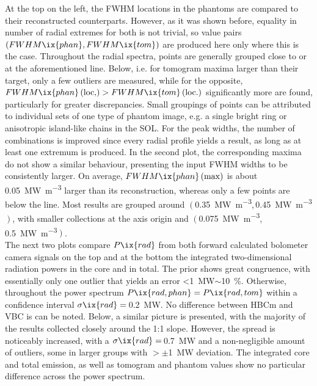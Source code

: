                 At the top on the left, the FWHM locations in the phantoms are compared to their reconstructed counterparts. However, as it was shown before, equality in number of radial extremes for both is not trivial, so value pairs $\left(FWHM\ix{phan}, FWHM\ix{tom}\right)$ are produced here only where this is the case. Throughout the radial spectra, points are generally grouped close to or at the aforementioned line. Below, i.e. for tomogram maxima larger than their target, only a few outliers are measured, while for the opposite, $FWHM\ix{phan}\left(\text{loc,}\right)>FWHM\ix{tom}\left(\text{loc.}\right)$ significantly more are found, particularly for greater discrepancies. Small groupings of points can be attributed to individual sets of one type of phantom image, e.g. a single bright ring or anisotropic island-like chains in the SOL. For the peak widths, the number of combinations is improved since every radial profile yields a result, as long as at least one extremum is produced. In the second plot, the corresponding maxima do not show a similar behaviour, presenting the input FWHM widths to be consistently larger. On average, $FWHM\ix{phan}\left(\text{max}\right)$ is about \SI{0.05}{\mega\watt\per\cubic\meter} larger than its reconstruction, whereas only a few points are below the line. Most results are grouped around $\left(\right.$\SI{0.35}{\mega\watt\per\cubic\meter},\,\SI{0.45}{\mega\watt\per\cubic\meter}$\left.\right)$, with smaller collections at the axis origin and $\left(\right.$\SI{0.075}{\mega\watt\per\cubic\meter},\,\SI{0.5}{\mega\watt\per\cubic\meter}$\left.\right)$.\\%
                The next two plots compare $P\ix{rad}$ from both forward calculated bolometer camera signals on the top and at the bottom the integrated two-dimensional radiation powers in the core and in total. The prior shows great congruence, with essentially only one outlier that yields an error <\SI{1}{\mega\watt}$\sim$\SI{10}{\percent}. Otherwise, throughout the power spectrum $P\ix{rad,phan}=P\ix{rad,tom}$ within a confidence interval $\sigma\ix{rad}=$\,\SI{0.2}{\mega\watt}. No difference between HBCm and VBC is can be noted. Below, a similar picture is presented, with the majority of the results collected closely around the 1:1 slope. However, the spread is noticeably increased, with a $\sigma\ix{rad}=$\,\SI{0.7}{\mega\watt} and a non-negligible amount of outliers, some in larger groups with $>\pm$\SI{1}{\mega\watt} deviation. The integrated core and total emission, as well as tomogram and phantom values show no particular difference across the power spectrum.\\%
